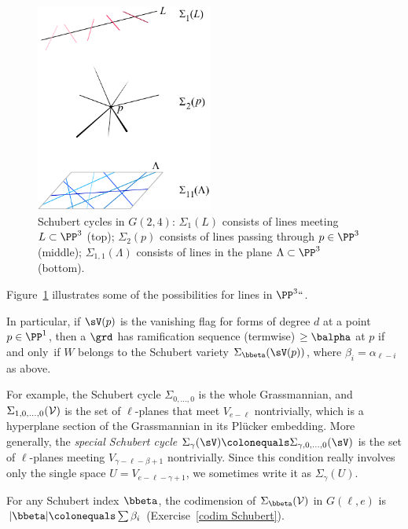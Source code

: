 \begin{figure}[b]
\centerline {\includegraphics[height=2.7in]{main/Fig12-2}}
\caption{
Schubert cycles in $G(2,4)$:
$\Sigma_{1}(L)$
consists of
lines meeting $L\subset\PP^3$
(top);
$\Sigma_{2}(p)$
consists of
lines passing through $p\in\PP^3$
(middle);
$\Sigma_{1,1}(\Lambda)$
consists of
 lines in the plane $\Lambda\subset
\PP^3$
(bottom).
}
\label{Schubert cycles in G(2,4)}
\end{figure}

Figure~\ref{Schubert cycles in G(2,4)} illustrates some of
the possibilities for lines in $\PP^3` `$.

In particular, if $\sV(p)$ is the vanishing flag for forms of degree $d$
at a point $p\in \PP^{1}$, then
a $\grd$ has ramification sequence (termwise) $\geq \balpha$ at $p$
%
if and only~if $W$ belongs
to the Schubert variety $\Sigma_{\bbeta}(\sV(p))$, where $\beta_{i} =
\alpha_{\ell-i}$ as above.

For example, the Schubert cycle $\Sigma_{0,\dots,0}$ is the whole
Grassmannian,
%
and $\Sigma_{1,0,\dots,0}(\cal V)$ is the set of $\ell$-planes that meet
$V_{e-\ell}$ nontrivially, which is
a hyperplane section of the Grassmannian in its
Pl\"ucker embedding.
%
More generally, the
\emph{special Schubert cycle}
%
%
$\Sigma_\gamma(\sV) \colonequals  \Sigma_{\gamma,0,\dots, 0}(\sV)$
is the set of $\ell$-planes
meeting  $V_{\gamma-\ell - \beta+1}$ nontrivially.
Since this condition really involves only the single space $U =
V_{e-\ell-\gamma+1}$, we sometimes
 write it
as $\Sigma_\gamma(U)$.

For any Schubert index $\bbeta$, the codimension of $\Sigma_{\bbeta}({\cal
V})$ in $G(\ell, e)$ is $|{\bbeta}|\colonequals  \sum \beta_i$
(Exercise~\ref{codim Schubert}).


